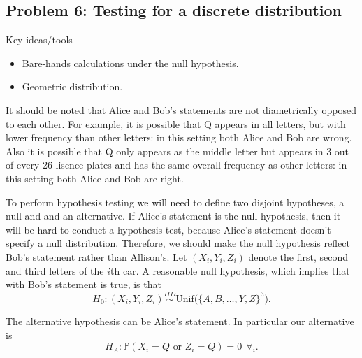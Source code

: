 \subsection*{Problem 6: Testing for a discrete distribution}
Key ideas/tools
\begin{itemize}
\item Bare-hands calculations under the null hypothesis.
\item Geometric distribution.
\end{itemize}


It should be noted that Alice and Bob's statements are not diametrically opposed to each other. For example, it is possible that Q appears in all letters, but with lower frequency than other letters: in this setting both Alice and Bob are wrong. Also it is possible that Q only appears as the middle letter but appears in 3 out of every 26 lisence plates and has the same overall frequency as other letters: in this setting both Alice and Bob are right. \newline

To perform hypothesis testing we will need to define two disjoint hypotheses, a null and and an alternative. If Alice's statement is the null hypothesis, then it will be hard to conduct a hypothesis test, because Alice's statement doesn't specify a null distribution. Therefore, we should make the null hypothesis reflect Bob's statement rather than Allison's.
 Let $(X_i,Y_i,Z_i)$ denote the first, second and third letters of the $i$th car. A reasonable null hypothesis, which implies that with Bob's statement is true, is that $$H_0: (X_i,Y_i,Z_i) \stackrel{IID}{\sim} \text{Unif} \Big( \{A,B,\dots, Y,Z\}^3 \Big).$$ 

The alternative hypothesis can be Alice's statement. In particular our alternative is $$H_A: \mathbb{P} (X_i=Q \text { or } Z_i=Q)=0 \ \ \forall_{i}.$$



